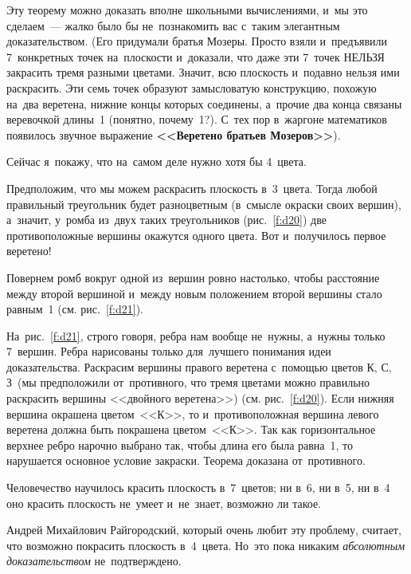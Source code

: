 Эту теорему можно доказать вполне школьными вычислениями, и~мы это сделаем~--- жалко было
бы не~познакомить вас с~таким элегантным доказательством.
 (Его придумали братья Мозеры. Просто
взяли и~предъявили 7~конкретных точек на~плоскости и~доказали, что даже эти 7~точек НЕЛЬЗЯ
закрасить тремя разными цветами. Значит, всю плоскость и~подавно нельзя ими раскрасить. Эти семь
точек образуют замысловатую конструкцию, похожую на~два веретена, нижние концы которых соединены,
а~прочие два конца связаны веревочкой длины~1 (понятно, почему~1?). С~тех пор в~жаргоне математиков
появилось звучное выражение \textbf{<<Веретено братьев Мозеров>>}).

Сейчас я~покажу, что на~самом деле нужно хотя бы 4~цвета.

Предположим, что мы можем раскрасить плоскость в~3~цвета. Тогда любой правильный треугольник будет
разноцветным (в~смысле окраски своих вершин), а~значит, у~ромба из~двух таких треугольников (рис.~\ref{f:d20})
две противоположные вершины окажутся одного цвета. Вот и~получилось первое веретено!


Повернем ромб вокруг одной из~вершин ровно настолько, чтобы расстояние между второй вершиной
и~между новым положением второй вершины стало равным~1 (см. рис.~\ref{f:d21}).


На~рис.~\ref{f:d21}, строго говоря, ребра нам вообще не~нужны, а~нужны только 7~вершин. Ребра нарисованы
только для~лучшего понимания идеи доказательства. Раскрасим вершины правого веретена с~помощью
цветов К, С, З~(мы предположили от~противного, что тремя цветами можно правильно раскрасить вершины
<<двойного веретена>>) (см. рис.~\ref{f:d20}). Если нижняя вершина
окрашена цветом~<<К>>, то и~противоположная вершина левого веретена должна быть
покрашена цветом~<<К>>. Так как горизонтальное верхнее ребро нарочно выбрано так, чтобы длина его была
равна~1, то нарушается основное условие закраски.
 Теорема доказана от~противного.

Человечество научилось красить плоскость в~7~цветов; ни в~6, ни в~5, ни в~4 оно красить плоскость
не~умеет и~не~знает, возможно ли такое.

Андрей Михайлович Райгородский, который очень любит эту проблему, считает, что возможно покрасить
плоскость в~4~цвета. Но~это пока никаким \textit{абсолютным доказательством} не~подтверждено.


